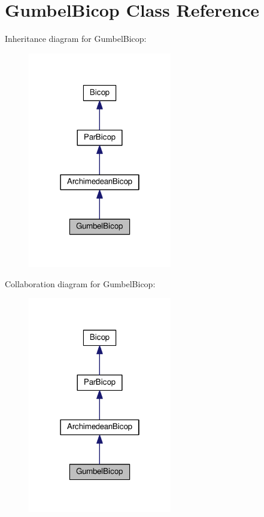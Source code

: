 \hypertarget{class_gumbel_bicop}{}\section{Gumbel\+Bicop Class Reference}
\label{class_gumbel_bicop}


Inheritance diagram for Gumbel\+Bicop\+:\nopagebreak
\begin{figure}[H]
\begin{center}
\leavevmode
\includegraphics[width=178pt]{class_gumbel_bicop__inherit__graph}
\end{center}
\end{figure}


Collaboration diagram for Gumbel\+Bicop\+:\nopagebreak
\begin{figure}[H]
\begin{center}
\leavevmode
\includegraphics[width=178pt]{class_gumbel_bicop__coll__graph}
\end{center}
\end{figure}
